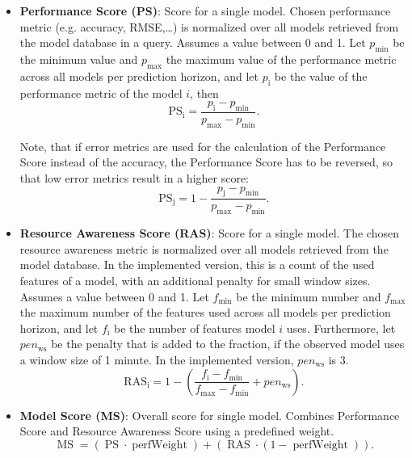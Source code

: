 \begin{itemize}
	\item \textbf{Performance Score (PS)}: Score for a single model. Chosen performance metric (e.g. accuracy, RMSE,…) is normalized over all models retrieved from the model database in a query. Assumes a value between 0 and 1. Let $p_\text{min}$ be the minimum value and $p_\text{max}$ the maximum value of the performance metric across all models per prediction horizon, and let $p_\text{i}$ be the value of the performance metric of the model $i$, then
	\begin{equation}
    \operatorname{PS_i} = \frac{p_\text{i} - p_{\text{min}}}{p_{\text{max}} - p_{\text{min}}}.
    \label{ps}
    \end{equation}

  Note, that if error metrics are used for the calculation of the Performance Score instead of the accuracy, the Performance Score has to be reversed, so that low error metrics result in a higher score:
  \begin{equation}
    \operatorname{PS_j} = 1- \frac{p_\text{j} - p_{\text{min}}}{p_{\text{max}} - p_{\text{min}}}.
    \label{psrev}
    \end{equation}

\item \textbf{Resource Awareness Score (RAS)}: Score for a single model. The chosen resource awareness metric is normalized over all models retrieved from the model database. In the implemented version, this is a count of the used features of a model, with an additional penalty for small window sizes. Assumes a value between 0 and 1. Let $f_\text{min}$ be the minimum number and $f_\text{max}$ the maximum number of the features used across all models per prediction horizon, and let $f_\text{i}$ be the number of features model $i$ uses. Furthermore, let $pen_\text{ws}$ be the penalty that is added to the fraction, if the observed model uses a window size of 1 minute. In the implemented version, $pen_\text{ws}$ is $3$.
\begin{equation}
  \operatorname{RAS_i} = 1- (\frac{f_\text{i} - f_{\text{min}}}{f_{\text{max}} - f_{\text{min}}} + pen_\text{ws}).
  \label{ras}
  \end{equation}



\item \textbf{Model Score (MS)}: Overall score for single model. Combines Performance Score and Resource Awareness Score using a predefined weight. 
\begin{equation}
 \operatorname{MS} = (\operatorname{PS} \cdot \operatorname{perfWeight}) + (\operatorname{RAS} \cdot (1- \operatorname{perfWeight})).
  \label{ms}
  \end{equation}


\end{itemize}
